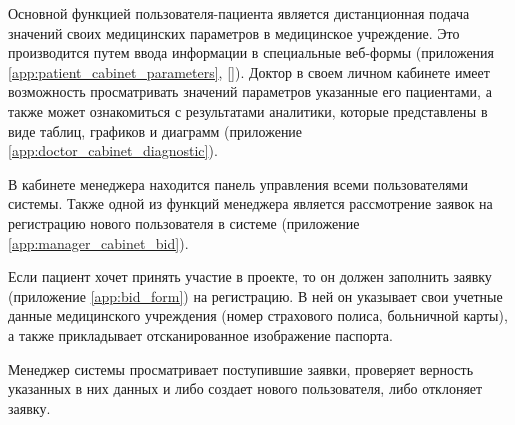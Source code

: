Основной функцией пользователя-пациента является дистанционная подача  значений
своих медицинских параметров в медицинское учреждение. Это производится путем
ввода информации в специальные веб-формы (приложения
\ref{app:patient_cabinet_parameters}, \ref{}). Доктор в своем личном кабинете
имеет возможность просматривать значений параметров указанные его пациентами, а также
может ознакомиться с результатами аналитики, которые представлены в виде таблиц,
графиков и диаграмм (приложение \ref{app:doctor_cabinet_diagnostic}).

В кабинете менеджера находится панель управления всеми пользователями системы.
Также одной из функций менеджера является рассмотрение заявок на регистрацию
нового пользователя в системе (приложение \ref{app:manager_cabinet_bid}).

Если пациент хочет принять участие в проекте, то он должен заполнить заявку
(приложение \ref{app:bid_form}) на регистрацию. В ней он указывает свои учетные
данные медицинского учреждения (номер страхового полиса, больничной карты), а
также прикладывает отсканированное изображение паспорта.

Менеджер системы просматривает поступившие заявки, проверяет верность указанных
в них данных и либо создает нового пользователя, либо отклоняет заявку.